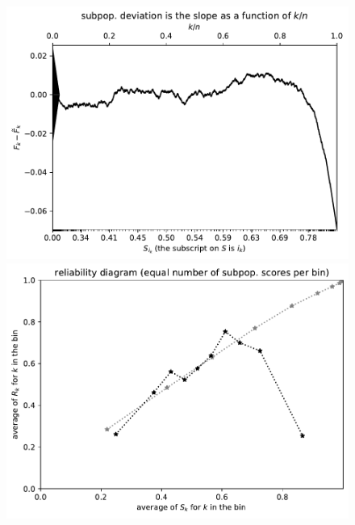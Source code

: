 \documentclass{article}
\begin{document}
\begin{figure}
\begin{centering}

\parbox{\imsize}{\includegraphics[width=\imsize]
                {./codes/unweighted/prob-1-248-Eskimo-dog-husky}}
\quad\quad
\parbox{\imsize}{\includegraphics[width=\imsize]
                {./codes/unweighted/prob-1-248-Eskimo-dog-huskyequisamps10}}

\vspace{\vertsep}


\end{centering}
\end{figure}
\end{document}
